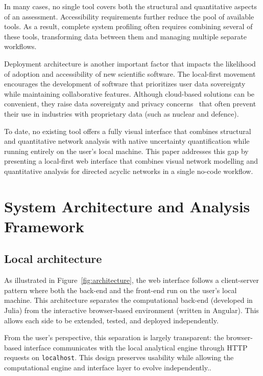 \documentclass[twocolumn]{rps-esrel2026}
\begin{document}
In many cases, no single tool covers both the structural and quantitative aspects of an assessment. Accessibility requirements further reduce the pool of available tools. As a result, complete system profiling often requires combining several of these tools, transforming data between them and managing multiple separate workflows.

Deployment architecture is another important factor that impacts the likelihood of adoption and accessibility of new scientific software. The local-first movement~\cite{kleppmann2019local} encourages the development of software that prioritizes user data sovereignty while maintaining collaborative features. Although cloud-based solutions can be convenient, they raise data sovereignty and privacy concerns~\cite{hashizume2013analysis} that often prevent their use in industries with proprietary data (such as nuclear and defence).

To date, no existing tool offers a fully visual interface that combines structural and quantitative network analysis with native uncertainty quantification while running entirely on the user's local machine. This paper addresses this gap by presenting a local-first web interface that combines visual network modelling and quantitative analysis for directed acyclic networks in a single no-code workflow.


\section{System Architecture and Analysis Framework}

\subsection{Local architecture}
As illustrated in Figure~\ref{fig:architecture}, the web interface follows a client-server pattern where both the back-end and the front-end run on the user's local machine. This architecture separates the computational back-end (developed in Julia) from the interactive browser-based environment (written in Angular). This allows each side to be extended, tested, and deployed independently. 


From the user's perspective, this separation is largely transparent:  the browser-based interface communicates with the local analytical engine  through HTTP requests on \texttt{localhost}. This design preserves usability while allowing the computational engine and interface layer to evolve independently..
\end{document}

